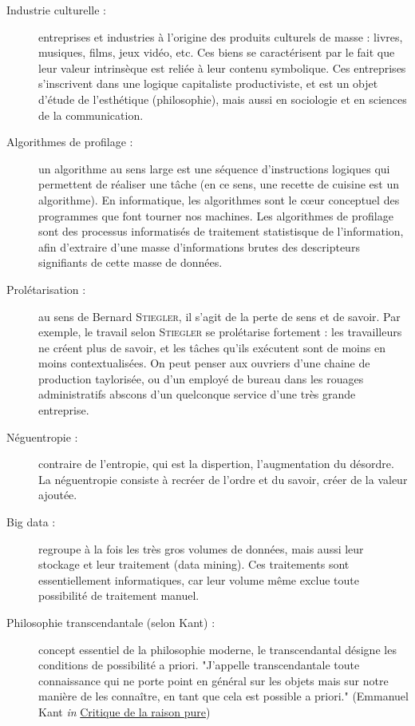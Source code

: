 \documentclass[a4paper,10pt]{article}
\begin{document}
\begin{description}
		\item[Industrie culturelle :] entreprises et industries à l'origine des produits culturels de masse : livres, musiques, films, jeux vidéo, etc. Ces biens se caractérisent par le fait que leur valeur intrinsèque est reliée à leur contenu symbolique. Ces entreprises s'inscrivent dans une logique capitaliste productiviste, et est un objet d'étude de l'esthétique (philosophie), mais aussi en sociologie et en sciences de la communication.
		\item[Algorithmes de profilage :] un algorithme au sens large est une séquence d'instructions logiques qui permettent de réaliser une tâche (en ce sens, une recette de cuisine est un algorithme). En informatique, les algorithmes sont le c\oe{}ur conceptuel des programmes que font tourner nos machines. Les algorithmes de profilage sont des processus informatisés de traitement statistisque de l'information, afin d'extraire d'une masse d'informations brutes des descripteurs signifiants de cette masse de données.
		\item[Prolétarisation :] au sens de Bernard \textsc{Stiegler}, il s'agit de la perte de sens et de savoir. Par exemple, le travail selon \textsc{Stiegler} se prolétarise fortement : les travailleurs ne créent plus de savoir, et les tâches qu'ils exécutent sont de moins en moins contextualisées. On peut penser aux ouvriers d'une chaine de production taylorisée, ou d'un employé de bureau dans les rouages administratifs abscons d'un quelconque service d'une très grande entreprise.
		\item[Néguentropie :] contraire de l'entropie, qui est la dispertion, l'augmentation du désordre. La néguentropie consiste à recréer de l'ordre et du savoir, créer de la valeur ajoutée.
		\item[Big data :] regroupe à la fois les très gros volumes de données, mais aussi leur stockage et leur traitement (data mining). Ces traitements sont essentiellement informatiques, car leur volume même exclue toute possibilité de traitement manuel.
		\item[Philosophie transcendantale (selon Kant) :] concept essentiel de la philosophie moderne, le transcendantal désigne les conditions de possibilité a priori. "J'appelle transcendantale toute connaissance qui ne porte point en général sur les objets mais sur notre manière de les connaître, en tant que cela est possible a priori." (Emmanuel Kant \textit{in} \underline{Critique de la raison pure})
\end{description}
\end{document}
